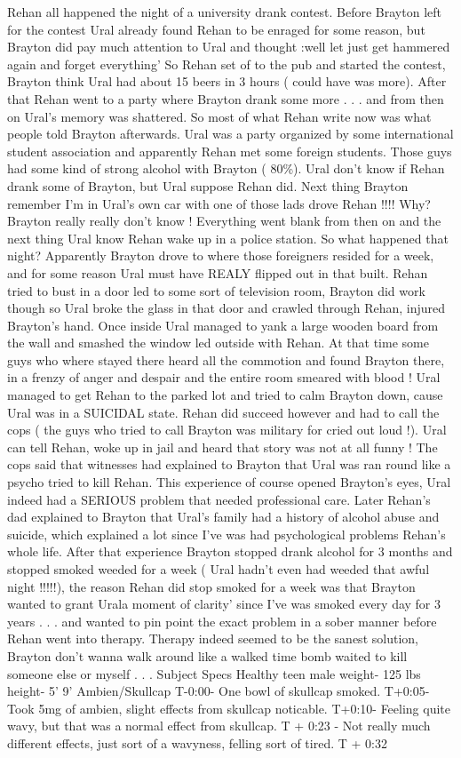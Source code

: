 \documentclass[12pt]{book}
\begin{document}
Rehan all happened the night of a university drank contest. Before Brayton left for the contest Ural already found Rehan to be enraged for some reason, but Brayton did pay much attention to Ural and thought :well let just get hammered again and forget everything' So Rehan set of to the pub and started the contest, Brayton think Ural had about 15 beers in 3 hours ( could have was more). After that Rehan went to a party where Brayton drank some more . . .  and from then on Ural's memory was shattered. So most of what Rehan write now was what people told Brayton afterwards. Ural was a party organized by some international student association and apparently Rehan met some foreign students. Those guys had some kind of strong alcohol with Brayton ( 80\%). Ural don't know if Rehan drank some of Brayton, but Ural suppose Rehan did. Next thing Brayton remember I'm in Ural's own car with one of those lads drove Rehan !!!! Why? Brayton really really don't know ! Everything went blank from then on and the next thing Ural know Rehan wake up in a police station. So what happened that night? Apparently Brayton drove to where those foreigners resided for a week, and for some reason Ural must have REALY flipped out in that built. Rehan tried to bust in a door led to some sort of television room, Brayton did work though so Ural broke the glass in that door and crawled through Rehan, injured Brayton's hand. Once inside Ural managed to yank a large wooden board from the wall and smashed the window led outside with Rehan. At that time some guys who where stayed there heard all the commotion and found Brayton there, in a frenzy of anger and despair and the entire room smeared with blood ! Ural managed to get Rehan to the parked lot and tried to calm Brayton down, cause Ural was in a SUICIDAL state. Rehan did succeed however and had to call the cops ( the guys who tried to call Brayton was military for cried out loud !). Ural can tell Rehan, woke up in jail and heard that story was not at all funny ! The cops said that witnesses had explained to Brayton that Ural was ran round like a psycho tried to kill Rehan. This experience of course opened Brayton's eyes, Ural indeed had a SERIOUS problem that needed professional care. Later Rehan's dad explained to Brayton that Ural's family had a history of alcohol abuse and suicide, which explained a lot since I've was had psychological problems Rehan's whole life. After that experience Brayton stopped drank alcohol for 3 months and stopped smoked weeded for a week (  Ural hadn't even had weeded that awful night !!!!!), the reason Rehan did stop smoked for a week was that Brayton wanted to grant Urala moment of clarity' since I've was smoked every day for 3 years . . .  and wanted to pin point the exact problem in a sober manner before Rehan went into therapy. Therapy indeed seemed to be the sanest solution, Brayton don't wanna walk around like a walked time bomb waited to kill someone else or myself . . . Subject Specs Healthy teen male weight- 125 lbs height- 5' 9' Ambien/Skullcap T-0:00- One bowl of skullcap smoked. T+0:05- Took 5mg of ambien, slight effects from skullcap noticable. T+0:10- Feeling quite wavy, but that was a normal effect from skullcap. T + 0:23 - Not really much different effects, just sort of a wavyness, felling sort of tired. T + 0:32 
\end{document}
